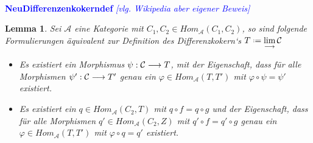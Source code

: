 \documentclass[10pt,a4paper]{report}
\newcounter{Aussage}[chapter]
\newtheorem{lemma}[Aussage]{Lemma}
\newcommand{\functionfront}[3]{\nolinebreak{#1:#2 \longrightarrow #3}}
\newcommand{\colimes}[0]{\lim\limits_{ \longrightarrow }}
\newcommand*{\defeq}{\mathrel{\vcenter{\baselineskip0.5ex \lineskiplimit0pt
                     \hbox{\scriptsize.}\hbox{\scriptsize.}}}%
                     =}
\begin{document}
\ \\
\textcolor{blue}{\textbf{NeuDifferenzenkokerndef} \textit{[vlg. Wikipedia aber eigener Beweis]}}
\begin{lemma}\label{NeuDifferenzenkokerndef} Sei $\mathcal{A}$ eine Kategorie mit $C_1,C_2 \in Hom_{\mathcal{A}}(C_1,C_2)$, so sind folgende Formulierungen äquivalent zur Definition des Differenzkokern`s $T \defeq \colimes \mathcal{C}$
\begin{itemize}
\item[1.] Es existiert ein Morphismus $\functionfront{\psi}{\mathcal{C}}{T}$, mit der Eigenschaft, dass für alle Morphismen $\functionfront{\psi '}{\mathcal{C}}{T'}$ genau ein $\varphi \in Hom_{\mathcal{A}}(T,T')$ mit $\varphi \circ \psi = \psi '$ existiert.
\item[2.] Es existiert ein $q \in Hom_{\mathcal{A}}(C_2,T)$ mit $q \circ f = q \circ g$ und der Eigenschaft, dass für alle Morphismen $q' \in Hom_{\mathcal{A}}(C_2,Z)$ mit $q' \circ f = q' \circ g$ genau ein $\varphi \in Hom_{\mathcal{A}}(T,T')$ mit $\varphi \circ q = q'$ existiert.
\begin{center}
\end{center}
\end{itemize}
\end{lemma}
\end{document}
